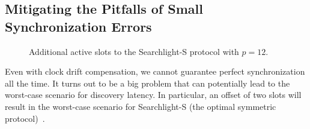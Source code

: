 \documentclass[twoside,twocolumn]{article}
\begin{document}
\subsection{Mitigating the Pitfalls of Small Synchronization Errors}
\label{subsec:pitfall}

\begin{figure}[t]\footnotesize
   \hfill
   \hfill
   \hfill
   \hfill
   \caption{Additional active slots to the Searchlight-S protocol with
      $p=12$.}
   \label{fig:searchlights}
\end{figure}

Even with clock drift compensation, we cannot guarantee perfect
synchronization all the time. It turns out to be a big problem that
can potentially lead to the worst-case scenario for discovery latency.
In particular, an offset of two slots will result in the
worst-case scenario for Searchlight-S (the optimal symmetric
protocol)~\citep{sun14hello}.
\end{document}
